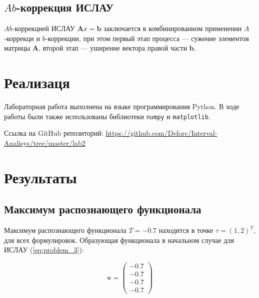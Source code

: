 \documentclass{article}
\begin{document}
\subsection{\( Ab \)-коррекция ИСЛАУ}

  \( Ab \)-коррекцией ИСЛАУ \( \mathbf{A}x = \mathbf{b} \) заключается
  в комбинированном применении \( A \)-коррекци и \( b \)-коррекции,
  при этом первый этап процесса --- сужение элементов матрицы
  \( \mathbf{A} \), второй этап --- уширение вектора правой части
  \( \mathbf{b} \).

  \section{Реализаця}

  Лабораторная работа выполнена на языке программирования Python. В ходе
  работы были также использованы библиотеки \verb!numpy! и
  \verb!matplotlib!.

  Ссылка на GitHub репозиторий:
  \url{https://github.com/Deforc/Interval-Analisys/tree/master/lab2}

  \section{Результаты}

  \subsection{Максимум распознающего функционала}

  Максимум распознающего функционала \( T = -0.7 \) находится в точке
  \( \tau = (1, 2)^T \), для всех формулировок. Образующая функционала в
  начальном случае для ИСЛАУ (\ref{eq:problem_3}):

  \begin{equation}
    \mathbf{v} = \begin{pmatrix}
      -0.7 \\
      -0.7 \\
      -0.7 \\
      -0.7
    \end{pmatrix}
  \end{equation}
\end{document}
